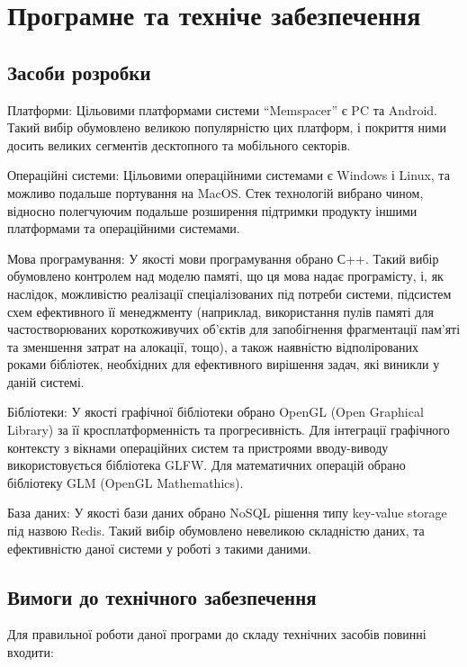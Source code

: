 \section{Програмне та техніче забезпечення}
\subsection{Засоби розробки}

Платформи:
Цільовими платформами системи ``Memspacer'' є PC та Android. Такий вибір обумовлено великою популярністю цих платформ, і покриття ними досить великих сегментів десктопного та мобільного секторів.

Операційні системи:
Цільовими операційними системами є Windows і Linux, та можливо подальше портування на MacOS.
Стек технологій вибрано чином, відносно полегчуючим подальше розширення підтримки продукту іншими платформами та операційними системами.

Мова програмування:
У якості мови програмування обрано С++. Такий вибір обумовлено контролем над моделю памяті, що ця мова надає програмісту, і, як наслідок, можливістю реалізації спеціалізованих під потреби системи, підсистем схем ефективного її менеджменту (наприклад, використання пулів памяті для частостворюваних короткоживучих об'єктів для запобігнення фрагментації пам'яті та зменшення затрат на алокації, тощо), а також наявністю відполірованих роками бібліотек, необхідних для ефективного вирішення задач, які виникли у даній системі.

Бібліотеки:
У якості графічної бібліотеки обрано OpenGL (Open Graphical Library) за її кросплатформенність та прогресивність.
Для інтеграції графічного контексту з вікнами операційних систем та пристроями вводу-виводу використовується бібліотека GLFW.
Для математичних операцій обрано бібліотеку GLM (OpenGL Mathemathics).

База даних:
У якості бази даних обрано NoSQL рішення типу key-value storage під назвою Redis. Такий вибір обумовлено невеликою складністю даних, та ефективністю даної системи у роботі з такими даними.

\subsection{Вимоги до технічного забезпечення}

Для правильної роботи даної програми до складу технічних засобів повинні входити:

